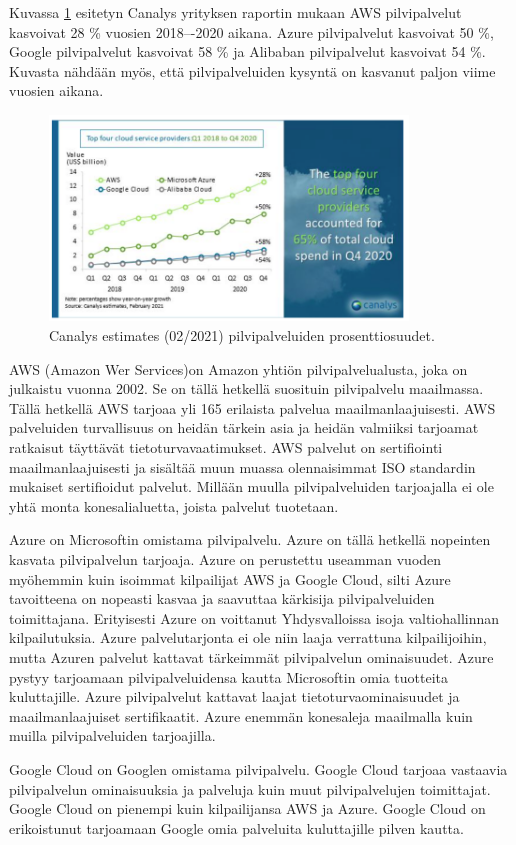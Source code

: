 Kuvassa \ref{canalys} esitetyn Canalys yrityksen raportin mukaan AWS pilvipalvelut kasvoivat 28 \% vuosien 2018–-2020 aikana. Azure pilvipalvelut kasvoivat 50 \%, Google pilvipalvelut kasvoivat 58 \% ja Alibaban pilvipalvelut kasvoivat 54 \%. Kuvasta nähdään myös, että pilvipalveluiden kysyntä on kasvanut paljon viime vuosien aikana.

\begin{figure}[ht]
\centering 
\includegraphics[width=0.85\textwidth]{figures/Canalys.png}
\caption{Canalys estimates (02/2021) pilvipalveluiden prosenttiosuudet. \citep{top_cloud}}\label{canalys}
\end{figure}

AWS (Amazon Wer Services)on Amazon yhtiön pilvipalvelualusta, joka on julkaistu vuonna 2002. Se on tällä hetkellä suosituin pilvipalvelu maailmassa. Tällä hetkellä AWS tarjoaa yli 165 erilaista palvelua maailmanlaajuisesti. AWS palveluiden turvallisuus on heidän tärkein asia ja heidän valmiiksi tarjoamat ratkaisut täyttävät tietoturvavaatimukset. AWS palvelut on sertifiointi maailmanlaajuisesti ja sisältää muun muassa olennaisimmat ISO standardin mukaiset sertifioidut palvelut. Millään muulla pilvipalveluiden tarjoajalla ei ole yhtä monta konesalialuetta, joista palvelut tuotetaan.\citep{top_cloud}

Azure on Microsoftin omistama pilvipalvelu. Azure on tällä hetkellä nopeinten kasvata pilvipalvelun tarjoaja. Azure on perustettu useamman vuoden myöhemmin kuin isoimmat kilpailijat AWS ja Google Cloud, silti Azure tavoitteena on nopeasti kasvaa ja saavuttaa kärkisija pilvipalveluiden toimittajana. Erityisesti Azure on voittanut Yhdysvalloissa isoja valtiohallinnan kilpailutuksia. Azure palvelutarjonta ei ole niin laaja verrattuna kilpailijoihin, mutta Azuren palvelut kattavat tärkeimmät pilvipalvelun ominaisuudet. Azure pystyy tarjoamaan pilvipalveluidensa kautta Microsoftin omia tuotteita kuluttajille. Azure pilvipalvelut kattavat laajat tietoturvaominaisuudet ja maailmanlaajuiset sertifikaatit. Azure enemmän konesaleja maailmalla kuin muilla pilvipalveluiden tarjoajilla.\citep{top_cloud}

Google Cloud on Googlen omistama pilvipalvelu. Google Cloud tarjoaa vastaavia pilvipalvelun ominaisuuksia ja palveluja kuin muut pilvipalvelujen toimittajat. Google Cloud on pienempi kuin kilpailijansa AWS ja Azure. Google Cloud on erikoistunut tarjoamaan Google omia palveluita kuluttajille pilven kautta.\citep{top_cloud}
